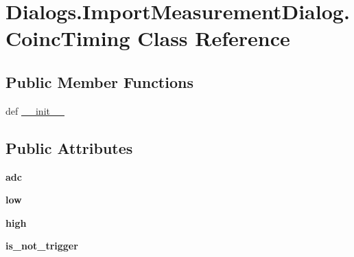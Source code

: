 \hypertarget{classDialogs_1_1ImportMeasurementDialog_1_1CoincTiming}{\section{Dialogs.\-Import\-Measurement\-Dialog.\-Coinc\-Timing Class Reference}
\label{classDialogs_1_1ImportMeasurementDialog_1_1CoincTiming}
}
\subsection*{Public Member Functions}
\begin{DoxyCompactItemize}
\item 
def \hyperlink{classDialogs_1_1ImportMeasurementDialog_1_1CoincTiming_a5c1dbdc1cc633e9cf9c58ee39c6b0f6e}{\-\_\-\-\_\-init\-\_\-\-\_\-}
\end{DoxyCompactItemize}
\subsection*{Public Attributes}
\begin{DoxyCompactItemize}
\item 
\hypertarget{classDialogs_1_1ImportMeasurementDialog_1_1CoincTiming_adb57c1132e8e1908f6c3387ed0b39960}{{\bfseries adc}}\label{classDialogs_1_1ImportMeasurementDialog_1_1CoincTiming_adb57c1132e8e1908f6c3387ed0b39960}

\item 
\hypertarget{classDialogs_1_1ImportMeasurementDialog_1_1CoincTiming_a18d70fd437487c02af93fd60d8a25ddc}{{\bfseries low}}\label{classDialogs_1_1ImportMeasurementDialog_1_1CoincTiming_a18d70fd437487c02af93fd60d8a25ddc}

\item 
\hypertarget{classDialogs_1_1ImportMeasurementDialog_1_1CoincTiming_a7bc7a9690c341362efc25d66a7effd8f}{{\bfseries high}}\label{classDialogs_1_1ImportMeasurementDialog_1_1CoincTiming_a7bc7a9690c341362efc25d66a7effd8f}

\item 
\hypertarget{classDialogs_1_1ImportMeasurementDialog_1_1CoincTiming_ababbeffb8aec6beb6f7c09349a86ee56}{{\bfseries is\-\_\-not\-\_\-trigger}}\label{classDialogs_1_1ImportMeasurementDialog_1_1CoincTiming_ababbeffb8aec6beb6f7c09349a86ee56}

\end{DoxyCompactItemize}


